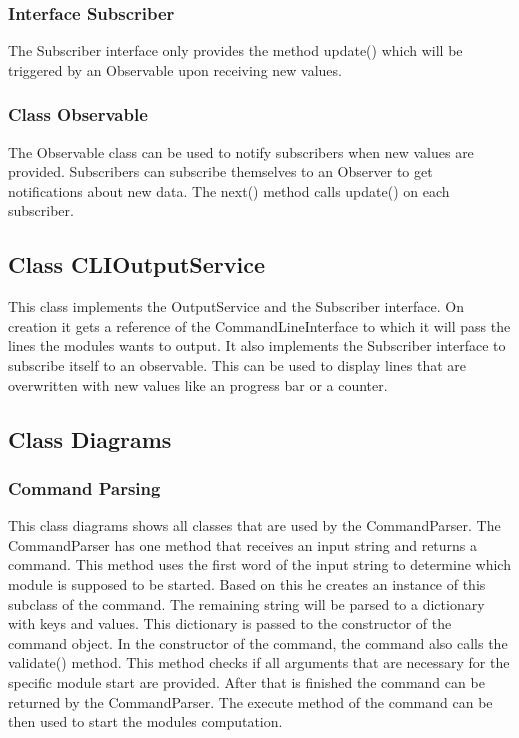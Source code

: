 \documentclass[parskip=full]{scrartcl}
\begin{document}
 \subsubsection{Interface Subscriber}
The Subscriber interface only provides the method update() which will be triggered by an Observable upon receiving new values.

\subsubsection{Class Observable} 
The Observable class can be used to notify subscribers when new values are provided.
Subscribers can subscribe themselves to an Observer to get notifications about new data.
The next() method calls update() on each subscriber.

\subsection{Class CLIOutputService}
This class implements the OutputService and the Subscriber interface. 
On creation it gets a reference of the CommandLineInterface to which it will pass the lines the modules wants to output.
It also implements the Subscriber interface to subscribe itself to an observable.
This can be used to display lines that are overwritten with new values like an progress bar or a counter.

\subsection{Class Diagrams}

\subsubsection{Command Parsing}

This class diagrams shows all classes that are used by the CommandParser.
The CommandParser has one method that receives an input string and returns a command.
This method uses the first word of the input string to determine which module is supposed to be started.
Based on this he creates an instance of this subclass of the command.
The remaining string will be parsed to a dictionary with keys and values.
This dictionary is passed to the constructor of the command object.
In the constructor of the command, the command also calls the validate() method.
This method checks if all arguments that are necessary for the specific module start are provided.
After that is finished the command can be returned by the CommandParser.
The execute method of the command can be then used to start the modules computation.
\end{document}

